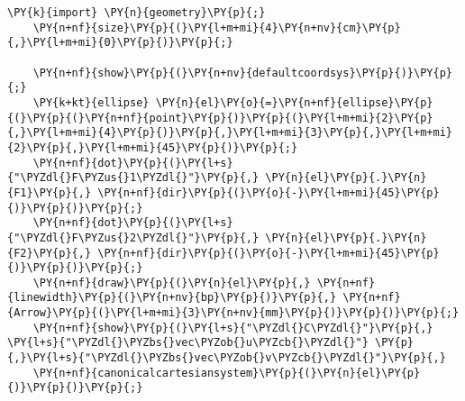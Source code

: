 \begin{Verbatim}[commandchars=\\\{\}]
    \PY{k}{import} \PY{n}{geometry}\PY{p}{;}
    \PY{n+nf}{size}\PY{p}{(}\PY{l+m+mi}{4}\PY{n+nv}{cm}\PY{p}{,}\PY{l+m+mi}{0}\PY{p}{)}\PY{p}{;}

    \PY{n+nf}{show}\PY{p}{(}\PY{n+nv}{defaultcoordsys}\PY{p}{)}\PY{p}{;}
    \PY{k+kt}{ellipse} \PY{n}{el}\PY{o}{=}\PY{n+nf}{ellipse}\PY{p}{(}\PY{p}{(}\PY{n+nf}{point}\PY{p}{)}\PY{p}{(}\PY{l+m+mi}{2}\PY{p}{,}\PY{l+m+mi}{4}\PY{p}{)}\PY{p}{,}\PY{l+m+mi}{3}\PY{p}{,}\PY{l+m+mi}{2}\PY{p}{,}\PY{l+m+mi}{45}\PY{p}{)}\PY{p}{;}
    \PY{n+nf}{dot}\PY{p}{(}\PY{l+s}{"\PYZdl{}F\PYZus{}1\PYZdl{}"}\PY{p}{,} \PY{n}{el}\PY{p}{.}\PY{n}{F1}\PY{p}{,} \PY{n+nf}{dir}\PY{p}{(}\PY{o}{-}\PY{l+m+mi}{45}\PY{p}{)}\PY{p}{)}\PY{p}{;}
    \PY{n+nf}{dot}\PY{p}{(}\PY{l+s}{"\PYZdl{}F\PYZus{}2\PYZdl{}"}\PY{p}{,} \PY{n}{el}\PY{p}{.}\PY{n}{F2}\PY{p}{,} \PY{n+nf}{dir}\PY{p}{(}\PY{o}{-}\PY{l+m+mi}{45}\PY{p}{)}\PY{p}{)}\PY{p}{;}
    \PY{n+nf}{draw}\PY{p}{(}\PY{n}{el}\PY{p}{,} \PY{n+nf}{linewidth}\PY{p}{(}\PY{n+nv}{bp}\PY{p}{)}\PY{p}{,} \PY{n+nf}{Arrow}\PY{p}{(}\PY{l+m+mi}{3}\PY{n+nv}{mm}\PY{p}{)}\PY{p}{)}\PY{p}{;}
    \PY{n+nf}{show}\PY{p}{(}\PY{l+s}{"\PYZdl{}C\PYZdl{}"}\PY{p}{,} \PY{l+s}{"\PYZdl{}\PYZbs{}vec\PYZob{}u\PYZcb{}\PYZdl{}"} \PY{p}{,}\PY{l+s}{"\PYZdl{}\PYZbs{}vec\PYZob{}v\PYZcb{}\PYZdl{}"}\PY{p}{,}
    \PY{n+nf}{canonicalcartesiansystem}\PY{p}{(}\PY{n}{el}\PY{p}{)}\PY{p}{)}\PY{p}{;}
\end{Verbatim}
